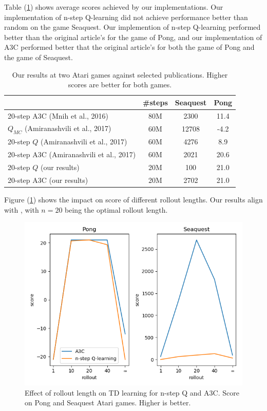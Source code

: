 \documentclass{article}
\begin{document}
Table (\ref{table1}) shows average scores achieved by our implementations. Our
implementation of n-step Q-learning did not achieve performance better than random
on the game Seaquest. Our implemention of n-step Q-learning performed better than
the original article's for the game of Pong, and our implementation of A3C performed
better that the original article's for both the game of Pong and the game of Seaquest.

\begin{table}[H]
\centering
\label{table1}
    \begin{tabular}{@{}l|c|cc}
    \toprule
                                             & \#steps  & Seaquest  & Pong  \\ \midrule
    20-step A3C (Mnih et al., 2016)          & 80M      & 2300      & 11.4  \\ \midrule
    $Q_{MC}$ (Amiranashvili et al., 2017)    & 60M      & 12708     & -4.2  \\
    20-step $Q$ (Amiranashvili et al., 2017) & 60M      & 4276      & 8.9   \\
    20-step A3C (Amiranashvili et al., 2017) & 60M      & 2021      & 20.6  \\ \midrule
    20-step $Q$ (our results)                & 20M      & 100       & 21.0  \\
    20-step A3C (our results)                & 20M      & 2702      & 21.0  \\ \bottomrule
    \end{tabular}
\caption{Our results at two Atari games against selected publications. Higher scores are better for both games.}
\end{table}

Figure (\ref{rollouts}) shows the impact on score of different rollout lengths.
Our results align with \cite{amiranashvili2018analyzing}, with $n=20$ being
the optimal rollout length.

\begin{figure}[H]
    \centering
    \includegraphics[scale=0.75]{results}
    \caption{Effect of rollout length on TD learning for n-step Q and A3C. Score on
    Pong and Seaquest Atari games. Higher is better.}
    \label{rollouts}
\end{figure}
\end{document}
